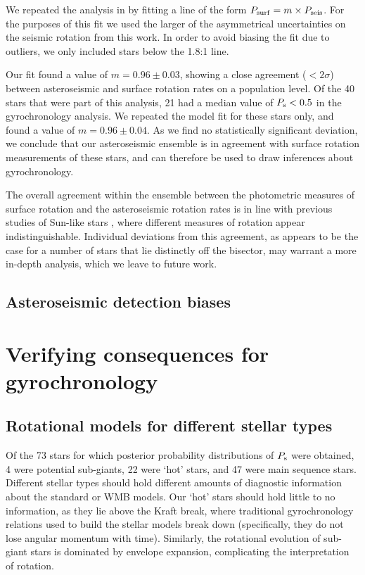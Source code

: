 We repeated the analysis in \cite{nielsen+2015} by fitting a line of the form $P_{\rm surf} = m \times P_{\rm seis}$. For the purposes of this fit we used the larger of the asymmetrical uncertainties on the seismic rotation from this work. In order to avoid biasing the fit due to outliers, we only included stars below the 1.8:1 line.

Our fit found a value of $m = 0.96\pm0.03$, showing a close agreement ($< 2\sigma$) between asteroseismic and surface rotation rates on a population level. Of the 40 stars that were part of this analysis, 21 had a median value of $P_{\rm s} < 0.5$ in the gyrochronology analysis. We repeated the model fit for these stars only, and found a value of $m = 0.96 \pm 0.04$. As we find no statistically significant deviation, we conclude that our asteroseismic ensemble is in agreement with surface rotation measurements of these stars, and can therefore be used to draw inferences about gyrochronology.

The overall agreement within the ensemble between the photometric measures of surface rotation and the asteroseismic rotation rates is in line with previous studies of Sun-like stars \cite{gizon+2013, chaplin+2013, nielsen+2015, benomar+2015}, where different measures of rotation appear indistinguishable.
Individual deviations from this agreement, as appears to be the case for a number of stars that lie distinctly off the bisector, may warrant a more in-depth analysis, which we leave to future work.

\subsection{Asteroseismic detection biases}

\section{Verifying consequences for gyrochronology}
\subsection{Rotational models for different stellar types}
Of the 73 stars for which posterior probability distributions of $P_{\rm s}$ were obtained, 4 were potential sub-giants, 22 were `hot' stars, and 47 were main sequence stars. Different stellar types should hold different amounts of diagnostic information about the standard or WMB models. Our `hot' stars should hold little to no information, as they lie above the Kraft break, where traditional gyrochronology relations used to build the stellar models break down (specifically, they do not lose angular momentum with time). Similarly, the rotational evolution of sub-giant stars is dominated by envelope expansion, complicating the interpretation of rotation. 


